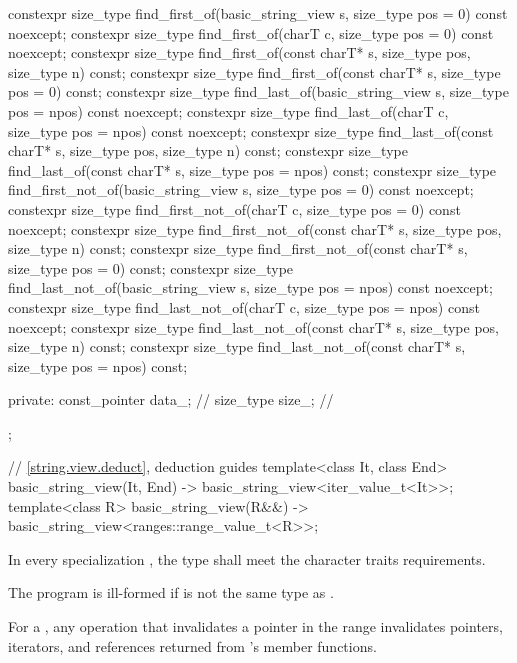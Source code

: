 \begin{codeblock}
{{    constexpr size_type find_first_of(basic_string_view s, size_type pos = 0) const noexcept;
    constexpr size_type find_first_of(charT c, size_type pos = 0) const noexcept;
    constexpr size_type find_first_of(const charT* s, size_type pos, size_type n) const;
    constexpr size_type find_first_of(const charT* s, size_type pos = 0) const;
    constexpr size_type find_last_of(basic_string_view s, size_type pos = npos) const noexcept;
    constexpr size_type find_last_of(charT c, size_type pos = npos) const noexcept;
    constexpr size_type find_last_of(const charT* s, size_type pos, size_type n) const;
    constexpr size_type find_last_of(const charT* s, size_type pos = npos) const;
    constexpr size_type find_first_not_of(basic_string_view s, size_type pos = 0) const noexcept;
    constexpr size_type find_first_not_of(charT c, size_type pos = 0) const noexcept;
    constexpr size_type find_first_not_of(const charT* s, size_type pos,
                                          size_type n) const;
    constexpr size_type find_first_not_of(const charT* s, size_type pos = 0) const;
    constexpr size_type find_last_not_of(basic_string_view s,
                                         size_type pos = npos) const noexcept;
    constexpr size_type find_last_not_of(charT c, size_type pos = npos) const noexcept;
    constexpr size_type find_last_not_of(const charT* s, size_type pos,
                                         size_type n) const;
    constexpr size_type find_last_not_of(const charT* s, size_type pos = npos) const;

  private:
    const_pointer data_;        // \expos
    size_type size_;            // \expos
  };

  // \ref{string.view.deduct}, deduction guides
  template<class It, class End>
    basic_string_view(It, End) -> basic_string_view<iter_value_t<It>>;
  template<class R>
    basic_string_view(R&&) -> basic_string_view<ranges::range_value_t<R>>;
}
\end{codeblock}

\pnum
In every specialization , the type  shall meet the character traits requirements.
\begin{note}
The program is ill-formed if  is not the same type as .
\end{note}

\pnum
For a ,
any operation that invalidates a pointer
in the range 
invalidates pointers, iterators, and references
returned from 's member functions.


